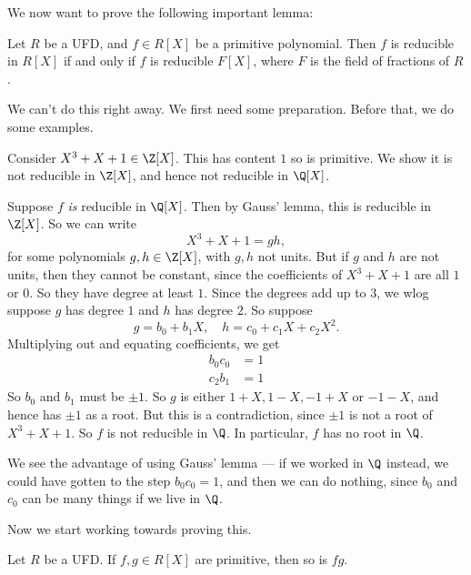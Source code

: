 \documentclass[a4paper]{article}
\begin{document}
We now want to prove the following important lemma:
\begin{lemma}
  Let $R$ be a UFD, and $f \in R[X]$ be a primitive polynomial. Then $f$ is reducible in $R[X]$ if and only if $f$ is reducible $F[X]$, where $F$ is the field of fractions of $R$.
\end{lemma}

We can't do this right away. We first need some preparation. Before that, we do some examples.
\begin{eg}
  Consider $X^3 + X + 1 \in \Z[X]$. This has content $1$ so is primitive. We show it is not reducible in $\Z[X]$, and hence not reducible in $\Q[X]$.

  Suppose $f$ \emph{is} reducible in $\Q[X]$. Then by Gauss' lemma, this is reducible in $\Z[X]$. So we can write
  \[
    X^3 + X + 1 = gh,
  \]
  for some polynomials $g, h \in \Z[X]$, with $g, h$ not units. But if $g$ and $h$ are not units, then they cannot be constant, since the coefficients of $X^3 + X + 1$ are all $1$ or $0$. So they have degree at least $1$. Since the degrees add up to $3$, we wlog suppose $g$ has degree $1$ and $h$ has degree $2$. So suppose
  \[
    g = b_0 + b_1X,\quad h = c_0 + c_1 X + c_2 X^2.
  \]
  Multiplying out and equating coefficients, we get
  \begin{align*}
    b_0 c_0 &= 1\\
    c_2 b_1 &= 1
  \end{align*}
  So $b_0$ and $b_1$ must be $\pm 1$. So $g$ is either $1 + X, 1 - X, -1 + X$ or $-1 - X$, and hence has $\pm 1$ as a root. But this is a contradiction, since $\pm 1$ is not a root of $X^3 + X + 1$. So $f$ is not reducible in $\Q$. In particular, $f$ has no root in $\Q$.
\end{eg}
We see the advantage of using Gauss' lemma --- if we worked in $\Q$ instead, we could have gotten to the step $b_0 c_0 = 1$, and then we can do nothing, since $b_0$ and $c_0$ can be many things if we live in $\Q$.

Now we start working towards proving this.
\begin{lemma}
  Let $R$ be a UFD. If $f, g \in R[X]$ are primitive, then so is $fg$.
\end{lemma}
\end{document}
